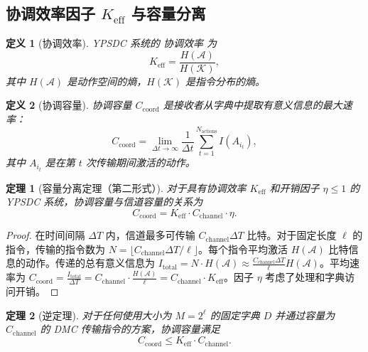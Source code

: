 \documentclass[12pt]{article}
\newtheorem{definition}{定义}
\newtheorem{theorem}{定理}
\begin{document}
	\subsection{协调效率因子 \(K_{\mathrm{eff}}\) 与容量分离}
	
	\begin{definition}[协调效率]
		YPSDC 系统的 \emph{协调效率} 为
		\begin{equation}
			K_{\mathrm{eff}} = \frac{H(\mathcal{A})}{H(\mathcal{K})},
			\label{eq:Kdef}
		\end{equation}
		其中 \(H(\mathcal{A})\) 是动作空间的熵，\(H(\mathcal{K})\) 是指令分布的熵。
	\end{definition}
	
	\begin{definition}[协调容量]
		\emph{协调容量} \(C_{\mathrm{coord}}\) 是接收者从字典中提取有意义信息的最大速率：
		\begin{equation}
			C_{\mathrm{coord}} = \lim_{\Delta t \to \infty} \frac{1}{\Delta t} \sum_{t=1}^{N_{\mathrm{actions}}} I(A_{i_t}),
		\end{equation}
		其中 \(A_{i_t}\) 是在第 \(t\) 次传输期间激活的动作。
	\end{definition}
	
	\begin{theorem}[容量分离定理（第二形式）]
		\label{thm:capacity-separation}
		对于具有协调效率 \(K_{\mathrm{eff}}\) 和开销因子 \(\eta \le 1\) 的 YPSDC 系统，协调容量与信道容量的关系为
		\begin{equation}
			\boxed{C_{\mathrm{coord}} = K_{\mathrm{eff}} \cdot C_{\mathrm{channel}} \cdot \eta}.
			\label{eq:capacity-separation}
		\end{equation}
	\end{theorem}
	
	\begin{proof}
		在时间间隔 \(\Delta T\) 内，信道最多可传输 \(C_{\mathrm{channel}} \Delta T\) 比特。对于固定长度 \(\ell\) 的指令，传输的指令数为 \(N = \lfloor C_{\mathrm{channel}} \Delta T / \ell \rfloor\)。每个指令平均激活 \(H(\mathcal{A})\) 比特信息的动作。传递的总有意义信息为 \(I_{\mathrm{total}} = N \cdot H(\mathcal{A}) \approx \frac{C_{\mathrm{channel}} \Delta T}{\ell} H(\mathcal{A})\)。平均速率为 \(C_{\mathrm{coord}} = \frac{I_{\mathrm{total}}}{\Delta T} = C_{\mathrm{channel}} \cdot \frac{H(\mathcal{A})}{\ell} = C_{\mathrm{channel}} \cdot K_{\mathrm{eff}}\)。因子 \(\eta\) 考虑了处理和字典访问开销。
	\end{proof}
	
	\begin{theorem}[逆定理]
		对于任何使用大小为 \(M = 2^\ell\) 的固定字典 \(D\) 并通过容量为 \(C_{\mathrm{channel}}\) 的 DMC 传输指令的方案，协调容量满足
		\[
		C_{\mathrm{coord}} \le K_{\mathrm{eff}} \cdot C_{\mathrm{channel}}.
		\]
	\end{theorem}
	
\end{document}
